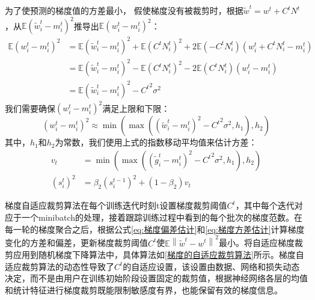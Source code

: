 为了使预测的梯度值的方差最小， 假使梯度没有被裁剪时，根据$\tilde{w}^{t}=w^{t}+C^{t} N^{t}$，从$\mathbb{E}\left(\tilde{w}_{i}^{t}-m_{i}^{t}\right)^{2}$推导出$\mathbb{E}\left(w_{i}^{t}-m_{i}^{t}\right)^{2}$：
$$
\begin{aligned}
\mathbb{E}\left(w_{i}^{t}-m_{i}^{t}\right)^{2} &=\mathbb{E}\left(\tilde{w}_{i}^{t}-m_{i}^{t}\right)^{2}+\mathbb{E}\left(C^{t} N_{i}^{t}\right)^{2}+2 \mathbb{E}\left(-C^{t} N_{i}^{t}\right)\left(w_{i}^{t}+C^{t} N_{i}^{t}-m_{i}^{t}\right) \\
&=\mathbb{E}\left(\tilde{w}_{i}^{t}-m_{i}^{t}\right)^{2}-\mathbb{E}\left(C^{t} N_{i}^{t}\right)^{2}-2 \mathbb{E}\left(C^{t} N_{i}^{t}\right)\left(w_{i}^{t}-m_{i}^{t}\right) \\
&=\mathbb{E}\left(\tilde{w}_{i}^{t}-m_{i}^{t}\right)^{2}-{C^{t}}^{2} \sigma^{2}
\end{aligned}
$$
我们需要确保$\left(w_{i}^{t}-m_{i}^{t}\right)^{2}$满足上限和下限：
$$
\left(w_{i}^{t}-m_{i}^{t}\right)^{2} \approx \min \left(\max \left(\left(\tilde{w}_{i}^{t}-m_{i}^{t}\right)^{2}-{C^{t}}^{2} \sigma^{2}, h_{1}\right), h_{2}\right)
$$
其中，$h_{1}$和$h_{2}$为常数，我们使用上式的指数移动平均值来估计方差：
\begin{equation}\label{eq:梯度方差估计}
\begin{aligned}
v_{t} &=\min \left(\max \left(\left(\tilde{g}_{i}^{t}-m_{i}^{t}\right)^{2}-{C^{t}}^{2} \sigma^{2}, h_{1}\right), h_{2}\right) \\
\left(s_{i}^{t}\right)^{2} &=\beta_{2}\left(s_{i}^{t-1}\right)^{2}+\left(1-\beta_{2}\right) v_{t}
\end{aligned}
\end{equation}

梯度自适应裁剪算法在每个训练迭代时刻t设置梯度裁剪阈值$C^{t}$，其中每个迭代对应于一个minibatch的处理，接着跟踪训练过程中看到的每个批次的梯度范数。在每一轮的梯度聚合之后，根据公式\ref{eq:梯度偏差估计}和\ref{eq:梯度方差估计}计算梯度变化的方差和偏差，更新梯度裁剪阈值$C^{t}$使$\mathbb{E}\left\|\tilde{w}^{t}-w^{t}\right\|^{2}$最小。将自适应梯度裁剪应用到随机梯度下降算法中，具体算法如\ref{梯度的自适应裁剪算法}所示。梯度自适应裁剪算法的动态性导致了$C^{t}$的自适应设置，该设置由数据、网络和损失动态决定，而不是由用户在训练初始阶段设置固定的裁剪值，根据神经网络各层的均值和统计特征进行梯度裁剪既能限制敏感度有界，也能保留有效的梯度信息。

